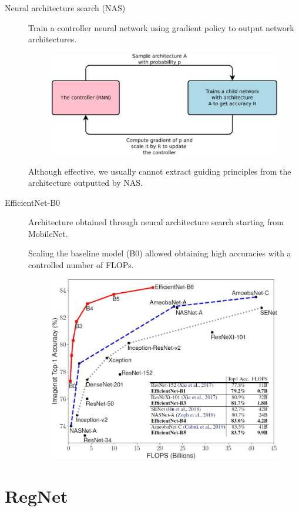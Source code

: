 \begin{description}
    \item[Neural architecture search (NAS)] 
        Train a controller neural network using gradient policy to output network architectures.

        \begin{figure}[H]
            \centering
            \includegraphics[width=0.45\linewidth]{./img/neural_architecture_search.jpg}
        \end{figure}

        \begin{remark}
            Although effective, we usually cannot extract guiding principles from the architecture outputted by NAS.
        \end{remark}

    \item[EfficientNet-B0] 
        Architecture obtained through neural architecture search starting from MobileNet.

        Scaling the baseline model (B0) allowed obtaining high accuracies with a controlled number of FLOPs.
        \begin{figure}[H]
            \centering
            \includegraphics[width=0.45\linewidth]{./img/efficientnet_scaling.jpg}
        \end{figure}
\end{description}



\section{RegNet}

